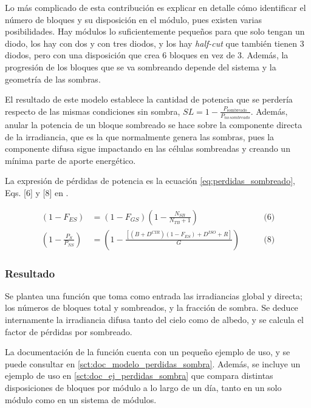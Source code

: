Lo más complicado de esta contribución es explicar en detalle cómo identificar el número de bloques y su disposición en el \gls{módulo}, pues existen varias posibilidades. Hay módulos lo suficientemente pequeños para que solo tengan un diodo, los hay con dos y con tres diodos, y los hay \textit{half-cut} que también tienen 3 diodos, pero con una disposición que crea 6 bloques en vez de 3. Además, la progresión de los bloques que se va sombreando depende del sistema y la geometría de las sombras.

El resultado de este modelo establece la cantidad de potencia que se perdería respecto de las mismas condiciones sin \gls{sombra}, $SL = 1 - \frac{P_\text{sombreado}}{P_{no\,sombreado}}$. Además, anular la potencia de un bloque sombreado se hace sobre la componente \gls{directa} de la irradiancia, que es la que normalmente genera las sombras, pues la componente \gls{difusa} sigue impactando en las células sombreadas y creando un mínima parte de aporte energético.

La expresión de pérdidas de potencia es la ecuación \ref{eq:perdidas_sombreado}, Eqs. [6] y [8] en \cite{Martínez-Moreno_Muñoz_Lorenzo_2010}.

\begin{equation} \label{eq:perdidas_sombreado}
    \begin{alignedat}{3}
        (1 - F_{ES}) &= (1 - F_{GS}) \left(1 - \frac{N_{SB}}{N_{TB} + 1}\right) \qquad &\text{(6)}\\
        \left(1 - \frac{P_{S}}{P_{NS}}\right) &= \left(1 - \frac{\left[(B + D^{CIR})(1 - F_{ES}) + D^{ISO} + R\right]}{G}\right) \qquad &\text{(8)}
    \end{alignedat}
\end{equation}

\subsubsection{Resultado}

Se plantea una función que toma como entrada las irradiancias global y directa; los números de bloques total y sombreados, y la fracción de \gls{sombra}. Se deduce internamente la irradiancia \gls{difusa} tanto del cielo como de \gls{albedo}, y se calcula el factor de pérdidas por sombreado.

La documentación de la función cuenta con un pequeño ejemplo de uso, y se puede consultar en \ref{sct:doc_modelo_perdidas_sombra}. Además, se incluye un ejemplo de uso en \ref{sct:doc_ej_perdidas_sombra} que compara distintas disposiciones de bloques por \gls{módulo} a lo largo de un día, tanto en un solo módulo como en un sistema de módulos.

